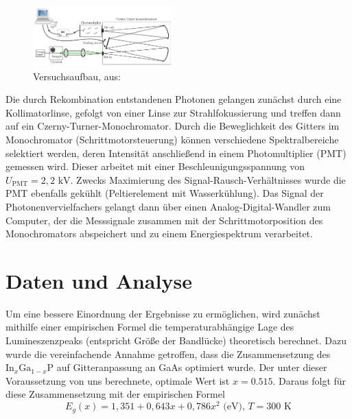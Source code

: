 \documentclass[aps,twocolumn,secnumarabic,nobalancelastpage,amsmath,amssymb,
nofootinbib,superscriptaddress]{revtex4-1}
\begin{document}
\begin{figure}[h]
  \centering
  \includegraphics[width=0.48\textwidth]{img/versuchsanleitung.jpg}
  \caption{Versuchsaufbau, aus: \cite{anleitung}}
  \label{fig:versuch}
\end{figure}

\noindent Die durch Rekombination entstandenen Photonen gelangen zunächst durch eine Kollimatorlinse, gefolgt von einer Linse zur
Strahlfokussierung und treffen dann auf ein Czerny-Turner-Monochromator. Durch die Beweglichkeit des Gitters im
Monochromator (Schrittmotorsteuerung) können verschiedene Spektralbereiche selektiert werden, deren Intensität anschließend in einem Photomultiplier (PMT)
gemessen wird. Dieser arbeitet mit einer Beschleunigungsspannung von $U_\text{PMT}=2,2\text{ kV}$. Zwecks Maximierung des
Signal-Rausch-Verhältnisses wurde die PMT ebenfalls gekühlt (Peltierelement mit Wasserkühlung). Das Signal der Photonenvervielfachers
gelangt dann über einen Analog-Digital-Wandler zum Computer, der die Messsignale zusammen mit der Schrittmotorposition des Monochromators
abspeichert und zu einem Energiespektrum verarbeitet.



\section{Daten und Analyse}

\noindent Um eine bessere Einordnung der Ergebnisse zu ermöglichen, wird zunächst mithilfe einer empirischen
Formel die temperaturabhängige Lage des Lumineszenzpeaks (entspricht Größe der Bandlücke) theoretisch berechnet.
Dazu wurde die vereinfachende Annahme getroffen, dass die Zusammensetzung des $\text{In}_x\text{Ga}_{1-x}\text{P}$
auf Gitteranpassung an GaAs optimiert wurde. Der unter dieser Voraussetzung von uns berechnete,
optimale Wert ist $x=0.515$. Daraus folgt für diese Zusammensetzung mit der empirischen Formel \cite{vorbereitung}
\begin{equation}
  E_{g}(x) = 1,351+0,643x+0,786x^2\text{ (eV), }T=300\text{ K}
   \label{eq:Ex}
\end{equation}
\end{document}
